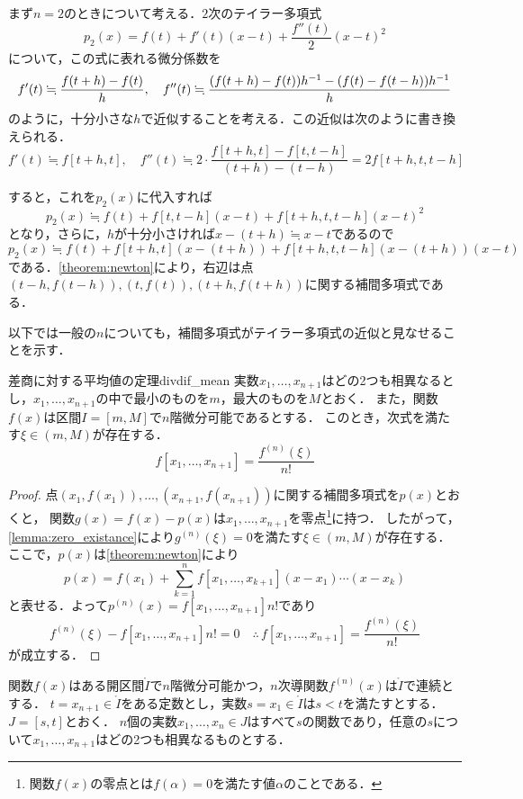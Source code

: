 \documentclass[a4paper]{ltjsarticle}
\theoremstyle{definition}
\DeclarePairedDelimiter{\pqty}{\lparen}{\rparen}
\begin{document}
まず$n=2$のときについて考える．$2$次のテイラー多項式
\[
  p_2(x)=f(t)+f'(t)(x-t)+\frac{f''(t)}{2}(x-t)^2
\]
について，この式に表れる微分係数を
\[
  f'(t)\fallingdotseq\frac{f(t+h)-f(t)}{h},\quad f''(t)\fallingdotseq\frac{\pqty*{f(t+h)-f(t)}h^{-1}-\pqty*{f(t)-f(t-h)}h^{-1}}{h}
\]
のように，十分小さな$h$で近似することを考える．この近似は次のように書き換えられる．
\[
  f'(t)\fallingdotseq f[t+h,t],\quad f''(t)\fallingdotseq 2\cdot\frac{f[t+h,t]-f[t,t-h]}{(t+h)-(t-h)}=2f[t+h,t,t-h]
\]

すると，これを$p_2(x)$に代入すれば
\[
  p_2(x)\fallingdotseq f(t)+f[t,t-h](x-t)+f[t+h,t,t-h](x-t)^2
\]
となり，さらに，$h$が十分小さければ$x-(t+h)\fallingdotseq x-t$であるので
\[
  p_2(x)\fallingdotseq f(t)+f[t+h,t](x-(t+h))+f[t+h,t,t-h](x-(t+h))(x-t)
\]
である．\cref{theorem:newton}により，右辺は点$(t-h,f(t-h)),(t,f(t)),(t+h,f(t+h))$に関する補間多項式である．

以下では一般の$n$についても，補間多項式がテイラー多項式の近似と見なせることを示す．

\begin{theorem}{差商に対する平均値の定理}{divdif_mean}
  実数$x_1,\dots,x_{n+1}$はどの2つも相異なるとし，$x_1,\dots,x_{n+1}$の中で最小のものを$m$，最大のものを$M$とおく．
  また，関数$f(x)$は区間$I = [m, M]$で$n$階微分可能であるとする．
  このとき，次式を満たす$\xi \in (m, M)$が存在する．
  \[
    f[x_1,\dots,x_{n+1}] = \frac{f^{(n)}(\xi)}{n!}
  \]
\end{theorem}

\begin{proof}
  点$(x_1,f(x_1)),\dots,(x_{n+1},f(x_{n+1}))$に関する補間多項式を$p(x)$とおくと，
  関数$g(x)=f(x)-p(x)$は$x_1,\dots,x_{n+1}$を零点\footnote{関数$f(x)$の零点とは$f(\alpha)=0$を満たす値$\alpha$のことである．}に持つ．
  したがって，\cref{lemma:zero_existance}により$g^{(n)}(\xi)=0$を満たす$\xi\in (m, M)$が存在する．
  ここで，$p(x)$は\cref{theorem:newton}により
  \[
    p(x) = f(x_1) + \sum_{k=1}^{n} f[x_1,\dots,x_{k+1}] (x-x_1) \dotsm (x-x_k)
  \]
  と表せる．よって$p^{(n)}(x) = f[x_1,\dots,x_{n+1}]n!$であり
  \[
    f^{(n)}(\xi) - f[x_1,\dots,x_{n+1}]n! = 0
    \quad\therefore\,
    f[x_1,\dots,x_{n+1}] = \frac{f^{(n)}(\xi)}{n!}
  \]
  が成立する．
\end{proof}

関数$f(x)$はある開区間$\mathring{I}$で$n$階微分可能かつ，$n$次導関数$f^{(n)}(x)$は$\mathring{I}$で連続とする．
$t=x_{n+1}\in\mathring{I}$をある定数とし，実数$s=x_1\in\mathring{I}$は$s<t$を満たすとする．$J=[s,t]$とおく．
$n$個の実数$x_1,\dots,x_n \in J$はすべて$s$の関数であり，任意の$s$について$x_1,\dots,x_{n+1}$はどの2つも相異なるものとする．
\end{document}

